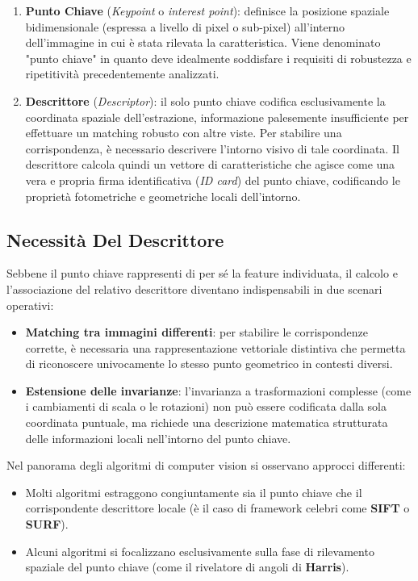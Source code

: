 ﻿\documentclass[11pt, a4paper]{article}
\begin{document}
\begin{enumerate}
    \item \textbf{Punto Chiave} (\emph{Keypoint} o \emph{interest point}): definisce la posizione spaziale bidimensionale (espressa a livello di pixel o sub-pixel) all'interno dell'immagine in cui è stata rilevata la caratteristica. Viene denominato "punto chiave" in quanto deve idealmente soddisfare i requisiti di robustezza e ripetitività precedentemente analizzati.
    \item \textbf{Descrittore} (\emph{Descriptor}): il solo punto chiave codifica esclusivamente la coordinata spaziale dell'estrazione, informazione palesemente insufficiente per effettuare un matching robusto con altre viste. Per stabilire una corrispondenza, è necessario descrivere l'intorno visivo di tale coordinata. Il descrittore calcola quindi un vettore di caratteristiche che agisce come una vera e propria firma identificativa (\emph{ID card}) del punto chiave, codificando le proprietà fotometriche e geometriche locali dell'intorno.
\end{enumerate}

\subsection{Necessità Del Descrittore}

Sebbene il punto chiave rappresenti di per sé la feature individuata, il calcolo e l'associazione del relativo descrittore diventano indispensabili in due scenari operativi:
\begin{itemize}[noitemsep]
    \item \textbf{Matching tra immagini differenti}: per stabilire le corrispondenze corrette, è necessaria una rappresentazione vettoriale distintiva che permetta di riconoscere univocamente lo stesso punto geometrico in contesti diversi.
    \item \textbf{Estensione delle invarianze}: l'invarianza a trasformazioni complesse (come i cambiamenti di scala o le rotazioni) non può essere codificata dalla sola coordinata puntuale, ma richiede una descrizione matematica strutturata delle informazioni locali nell'intorno del punto chiave.
\end{itemize}

Nel panorama degli algoritmi di computer vision si osservano approcci differenti:
\begin{itemize}[noitemsep]
    \item Molti algoritmi estraggono congiuntamente sia il punto chiave che il corrispondente descrittore locale (è il caso di framework celebri come \textbf{SIFT} o \textbf{SURF}).
    \item Alcuni algoritmi si focalizzano esclusivamente sulla fase di rilevamento spaziale del punto chiave (come il rivelatore di angoli di \textbf{Harris}).
\end{itemize}
\end{document}

